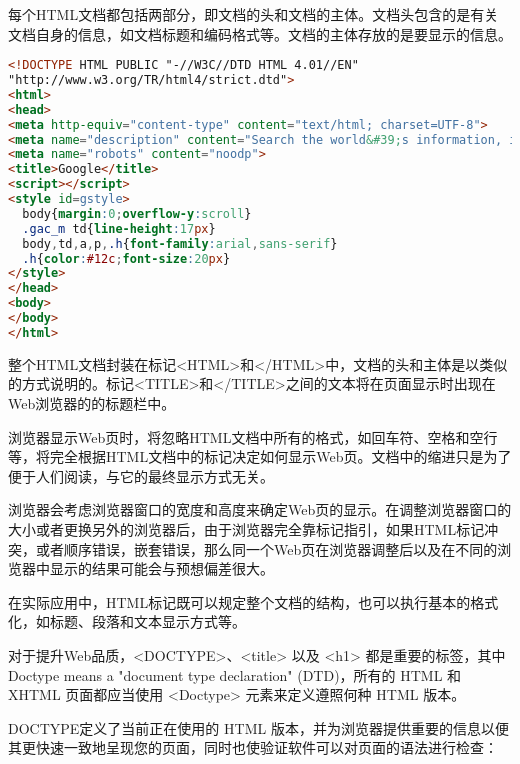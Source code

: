 每个HTML文档都包括两部分，即文档的头和文档的主体。文档头包含的是有关文档自身的信息，如文档标题和编码格式等。文档的主体存放的是要显示的信息。

\begin{lstlisting}[language=HTML]
<!DOCTYPE HTML PUBLIC "-//W3C//DTD HTML 4.01//EN"
"http://www.w3.org/TR/html4/strict.dtd">
<html>
<head>
<meta http-equiv="content-type" content="text/html; charset=UTF-8">
<meta name="description" content="Search the world&#39;s information, including webpages, images, videos and more.">
<meta name="robots" content="noodp">
<title>Google</title>
<script></script>
<style id=gstyle>
  body{margin:0;overflow-y:scroll}
  .gac_m td{line-height:17px}
  body,td,a,p,.h{font-family:arial,sans-serif}
  .h{color:#12c;font-size:20px}
</style>
</head>
<body>
</body>
</html>
\end{lstlisting}

整个HTML文档封装在标记<HTML>和</HTML>中，文档的头和主体是以类似的方式说明的。标记<TITLE>和</TITLE>之间的文本将在页面显示时出现在Web浏览器的的标题栏中。

浏览器显示Web页时，将忽略HTML文档中所有的格式，如回车符、空格和空行等，将完全根据HTML文档中的标记决定如何显示Web页。文档中的缩进只是为了便于人们阅读，与它的最终显示方式无关。
	
浏览器会考虑浏览器窗口的宽度和高度来确定Web页的显示。在调整浏览器窗口的大小或者更换另外的浏览器后，由于浏览器完全靠标记指引，如果HTML标记冲突，或者顺序错误，嵌套错误，那么同一个Web页在浏览器调整后以及在不同的浏览器中显示的结果可能会与预想偏差很大。

在实际应用中，HTML标记既可以规定整个文档的结构，也可以执行基本的格式化，如标题、段落和文本显示方式等。

对于提升Web品质，<DOCTYPE>、<title> 以及 <h1> 都是重要的标签，其中Doctype means a "document type declaration" (DTD)，所有的 HTML 和 XHTML 页面都应当使用 <Doctype> 元素来定义遵照何种 HTML 版本。

DOCTYPE定义了当前正在使用的 HTML 版本，并为浏览器提供重要的信息以便其更快速一致地呈现您的页面，同时也使验证软件可以对页面的语法进行检查：

